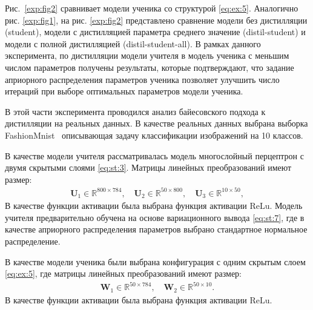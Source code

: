 Рис.~\ref{exp:fig2} сравнивает модели ученика со структурой \eqref{eq:ex:5}. Аналогично рис. \ref{exp:fig1}, на рис. \ref{exp:fig2} представлено сравнение модели без дистилляции (student), модели с дистилляцией параметра среднего значение (distil-student) и модели с полной дистилляцией (distil-student-all). В рамках данного эксперимента, по дистилляции модели учителя в модель ученика с меньшим числом параметров получены результаты, которые подтверждают, что задание априорного распределения параметров ученика позволяет улучшить число итераций при выборе оптимальных параметров модели ученика.

В этой части эксперимента проводился анализ байесовского подхода к дистилляции на реальных данных.  В качестве реальных данных выбрана выборка FashionMnist~\cite{fashionmnist} описывающая задачу классификации изображений на 10 классов.

В качестве модели учителя рассматривалась модель многослойный перцептрон с двумя скрытыми слоями \eqref{eq:st:3}. Матрицы линейных преобразований имеют размер:
\[
\label{eq:ex:7}
\begin{aligned}
\mathbf{U}_{1} \in \mathbb{R}^{800 \times 784}, \quad \mathbf{U}_{2} \in \mathbb{R}^{50 \times 800}, \quad \mathbf{U}_{3} \in \mathbb{R}^{10 \times 50},
\end{aligned}
\]
В качестве функции активации была выбрана функция активации $\text{ReLu}$.
Модель учителя предварительно обучена на основе вариационного вывода \eqref{eq:st:7}, где в качестве априорного распределения параметров выбрано стандартное нормальное распределение.

В качестве модели ученика были выбрана конфигурация с одним скрытым слоем \eqref{eq:ex:5}, где матрицы линейных преобразований имеют размер:
\[
\label{eq:ex:7}
\begin{aligned}
\mathbf{W}_{1} \in \mathbb{R}^{50 \times 784}, \quad \mathbf{W}_{2} \in \mathbb{R}^{50 \times 10}.
\end{aligned}
\]
В качестве функции активации была выбрана функция активации $\text{ReLu}$.

